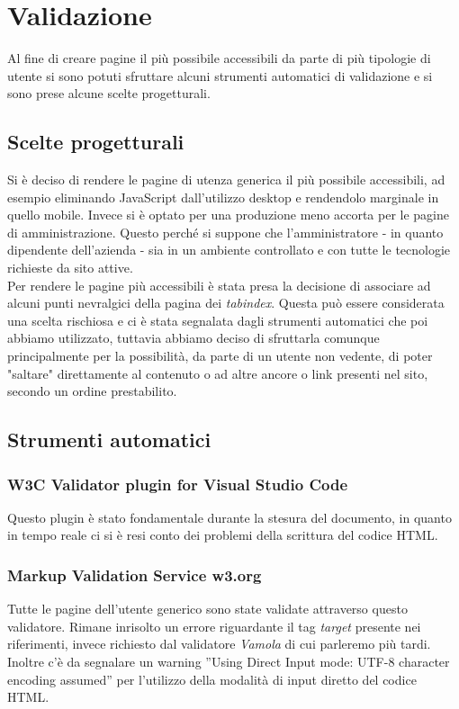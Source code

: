 \newpage
\section{Validazione}
Al fine di creare pagine il più possibile accessibili da parte di più tipologie di utente si sono potuti sfruttare alcuni strumenti automatici di validazione e si sono prese alcune scelte progetturali.
\subsection{Scelte progetturali}
Si è deciso di rendere le pagine di utenza generica il più possibile accessibili, ad esempio eliminando JavaScript dall'utilizzo desktop e rendendolo marginale in quello mobile. Invece si è optato per una produzione meno accorta per le pagine di amministrazione. Questo perché si suppone che l'amministratore - in quanto dipendente dell'azienda - sia in un ambiente controllato e con tutte le tecnologie richieste da sito attive.
\\Per rendere le pagine più accessibili è stata presa la decisione di associare ad alcuni punti nevralgici della pagina dei \emph{tabindex}. Questa può essere considerata una scelta rischiosa e ci è stata segnalata dagli strumenti automatici che poi abbiamo utilizzato, tuttavia abbiamo deciso di sfruttarla comunque principalmente per la possibilità, da parte di un utente non vedente, di poter "saltare" direttamente al contenuto o ad altre ancore o link presenti nel sito, secondo un ordine prestabilito.
\subsection{Strumenti automatici}
\subsubsection{W3C Validator plugin for Visual Studio Code}
Questo plugin è stato fondamentale durante la stesura del documento, in quanto in tempo reale ci si è resi conto dei problemi della scrittura del codice HTML.
\subsubsection{Markup Validation Service w3.org}
Tutte le pagine dell'utente generico sono state validate attraverso questo validatore. Rimane inrisolto un errore riguardante il tag \emph{target} presente nei riferimenti, invece richiesto dal validatore \emph{Vamola} di cui parleremo più tardi. Inoltre c'è da segnalare un warning ”Using Direct Input mode: UTF-8 character encoding assumed” per l’utilizzo della modalità di input diretto del codice HTML.
